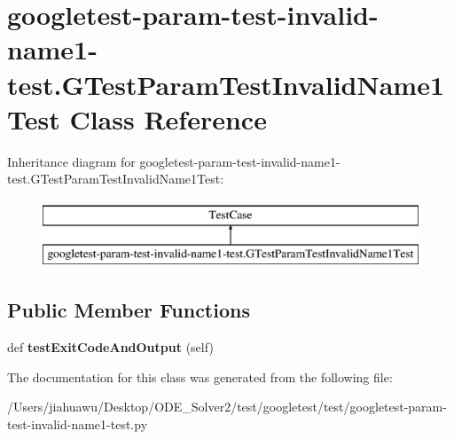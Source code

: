 \hypertarget{classgoogletest-param-test-invalid-name1-test_1_1_g_test_param_test_invalid_name1_test}{}\section{googletest-\/param-\/test-\/invalid-\/name1-\/test.G\+Test\+Param\+Test\+Invalid\+Name1\+Test Class Reference}
\label{classgoogletest-param-test-invalid-name1-test_1_1_g_test_param_test_invalid_name1_test}
Inheritance diagram for googletest-\/param-\/test-\/invalid-\/name1-\/test.G\+Test\+Param\+Test\+Invalid\+Name1\+Test\+:\begin{figure}[H]
\begin{center}
\leavevmode
\includegraphics[height=2.000000cm]{classgoogletest-param-test-invalid-name1-test_1_1_g_test_param_test_invalid_name1_test}
\end{center}
\end{figure}
\subsection*{Public Member Functions}
\begin{DoxyCompactItemize}
\item 
\mbox{\label{classgoogletest-param-test-invalid-name1-test_1_1_g_test_param_test_invalid_name1_test_a2b7024a50e0b3b0fe9b0c6d28e470681}} 
def {\bfseries test\+Exit\+Code\+And\+Output} (self)
\end{DoxyCompactItemize}


The documentation for this class was generated from the following file\+:\begin{DoxyCompactItemize}
\item 
/\+Users/jiahuawu/\+Desktop/\+O\+D\+E\+\_\+\+Solver2/test/googletest/test/googletest-\/param-\/test-\/invalid-\/name1-\/test.\+py\end{DoxyCompactItemize}
